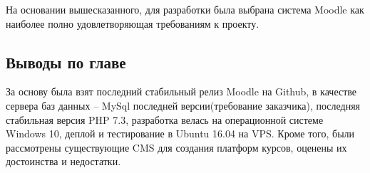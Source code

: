 \documentclass[a4paper,14pt]{article}
\begin{document}
На основании вышесказанного, для разработки была выбрана система Moodle как наиболее полно удовлетворяющая требованиям к проекту.

\subsection{Выводы по главе}

За основу была взят последний стабильный релиз Moodle на Github, в качестве сервера баз данных -- MySql последней версии(требование заказчика), последняя стабильная версия PHP 7.3, разработка велась на операционной системе Windows 10, деплой и тестирование в Ubuntu 16.04 на VPS. 
Кроме того, были рассмотрены существующие CMS для создания платформ курсов, оценены их достоинства и недостатки.























\end{document}

